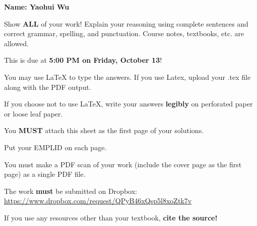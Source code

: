 \documentclass{article}
\theoremstyle{definition}
\begin{document}
\thispagestyle{empty}


 \hfill {\bf \large Name: Yaohui Wu}

\vspace{1cm}

 Show {\bf ALL} of your work! Explain your reasoning using complete sentences and correct grammar, spelling, and punctuation. Course notes, textbooks, etc. are allowed. 

\vspace{.25cm}

\noindent This is due at {\bf 5:00 PM on Friday, October 13}!

\vspace{.25cm}

\noindent You may use LaTeX to type the answers. If you use Latex, upload your .tex file along with the PDF output.

\vspace{.25cm}

\noindent If you choose not to use LaTeX, write your answers {\bf legibly} on perforated paper or loose leaf paper. 

\vspace{.25cm}

\noindent You {\bf \large MUST} attach this sheet as the first page of your solutions.

\vspace{.25cm}

\noindent Put your EMPLID on each page.

\vspace{.25cm}

 You must make a PDF scan of your work (include the cover page as the first page) as a single PDF file.

\vspace{.25cm}

\noindent The work {\bf must} be submitted on Dropbox: \href{https://www.dropbox.com/request/QPyB46xQsp5l8xoZtk7v}{https://www.dropbox.com/request/QPyB46xQsp5l8xoZtk7v}

\vspace{.25cm}

\noindent If you use any resources other than your textbook, {\bf cite the source!}

\vspace{.25cm}

\end{document}
